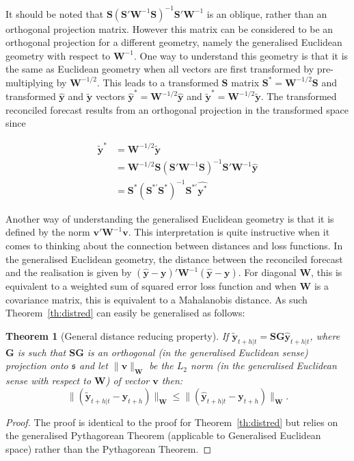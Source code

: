 \documentclass[12pt]{article}
\newtheorem{theo}{Theorem}[section]
\theoremstyle{definition}
\theoremstyle{property}
\begin{document}
	It should be noted that  $\bm{S}\left(\bm{S}'\bm{W}^{-1}\bm{S}\right)^{-1}\bm{S}'\bm{W}^{-1}$ is an oblique, rather than an orthogonal projection matrix.  However this matrix can be considered to be an orthogonal projection for a different geometry, namely the generalised Euclidean geometry with respect to $\bm{W}^{-1}$.  One way to understand this geometry is that it is the same as Euclidean geometry when all vectors are first transformed by pre-multiplying by $\bm{W}^{-1/2}$.  This leads to a transformed $\bm{S}$ matrix $\bm{S}^*=\bm{W}^{-1/2}\bm{S}$ and transformed $\hat{\bm{y}}$ and $\tilde{\bm{y}}$ vectors $\hat{\bm{y}}^*=\bm{W}^{-1/2}\hat{\bm{y}}$ and $\tilde{\bm{y}}^*=\bm{W}^{-1/2}\tilde{\bm{y}}$.  The transformed reconciled forecast results from an orthogonal projection in the transformed space since 
	
	\begin{align}
	\tilde{\bm{y}}^*&=\bm{W}^{-1/2}\tilde{\bm{y}}\\&=\bm{W}^{-1/2}\bm{S}\left(\bm{S}'\bm{W}^{-1}\bm{S}\right)^{-1}\bm{S}'\bm{W}^{-1}\hat{\bm{y}}
	\\&=\bm{S}^*\left(\bm{S}^{*'}\bm{S}^*\right)^{-1}\bm{S}^{*'}\hat{\bm{y}^*}
	\end{align}
	
	Another way of understanding the generalised Euclidean geometry is that it is defined by the norm $\bm{v}'\bm{W}^{-1}\bm{v}$.  This interpretation is quite instructive when it comes to thinking about the connection between distances and loss functions.  In the generalised Euclidean geometry, the distance between the reconciled forecast and the realisation is given by $(\hat{\bm{y}}-\bm{y})'\bm{W}^{-1}(\hat{\bm{y}}-\bm{y})$.  For diagonal $\bm{W}$, this is equivalent to a weighted sum of squared error loss function and when $\bm{W}$ is a covariance matrix, this is equivalent to a Mahalanobis distance.  As such Theorem~\ref{th:distred} can easily be generalised as follows:
	
	\begin{theo}[General distance reducing property]\label{th:gdistred}
        If $\tilde{\bm{y}}_{t+h|t}=\bm{S}\bm{G}\hat{\bm{y}}_{t+h|t}$, where $\bm{G}$ is such that $\bm{S}\bm{G}$ is an orthogonal (in the generalised Euclidean sense) projection onto $\mathfrak{s}$ and let $\|\bm{v}\|_{\bm{W}}$ be the $L_2$ norm (in the generalised Euclidean sense with respect to $\bm{W}$) of vector $\bm{v}$ then:
		\begin{equation}
		\|(\tilde{\bm{y}}_{t+h|t}-\bm{y}_{t+h})\|_{\bm W}\le\|(\hat{\bm{y}}_{t+h|t}-\bm{y}_{t+h})\|_{\bm W}.
		\end{equation}
	\end{theo}
	\begin{proof}
    The proof is identical to the proof for Theorem~\ref{th:distred} but relies on the generalised Pythagorean Theorem (applicable to Generalised Euclidean space) rather than the Pythagorean Theorem.
    \end{proof}  
	
\end{document}
